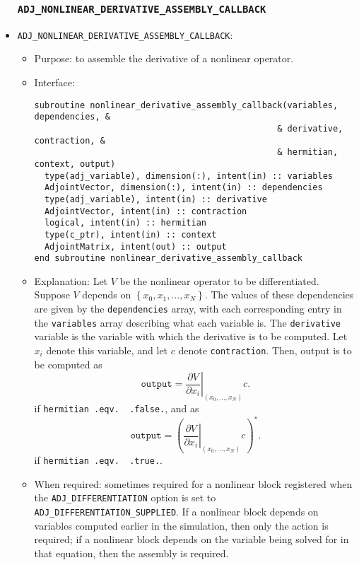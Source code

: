 \documentclass[10pt,authoryear]{elsarticle}
\begin{document}
\begin{itemize}
\subsubsection{\texttt{ADJ\_NONLINEAR\_DERIVATIVE\_ASSEMBLY\_CALLBACK}}
\item \texttt{ADJ\_NONLINEAR\_DERIVATIVE\_ASSEMBLY\_CALLBACK}:
 \begin{itemize} 
 \item Purpose: to assemble the derivative of a nonlinear operator.
 \item Interface:
\begin{verbatim}
subroutine nonlinear_derivative_assembly_callback(variables, dependencies, &
                                                & derivative, contraction, & 
                                                & hermitian, context, output)
  type(adj_variable), dimension(:), intent(in) :: variables
  AdjointVector, dimension(:), intent(in) :: dependencies
  type(adj_variable), intent(in) :: derivative
  AdjointVector, intent(in) :: contraction
  logical, intent(in) :: hermitian
  type(c_ptr), intent(in) :: context
  AdjointMatrix, intent(out) :: output
end subroutine nonlinear_derivative_assembly_callback
\end{verbatim}
 \item Explanation: Let $V$ be the nonlinear operator to be differentiated. Suppose $V$ depends on $\left\{x_0, x_1, \dots, x_N\right\}$. The values of these
dependencies are given by the \texttt{dependencies} array, with each corresponding entry in the \texttt{variables} array describing what each variable is. The \texttt{derivative} variable
is the variable with which the derivative is to be computed. Let $x_i$ denote this variable, and let $c$ denote \texttt{contraction}. Then, output is to be computed as
\begin{equation}
\texttt{output} = \left.\frac{\partial V}{\partial x_i}\right|_{(x_0, \dots, x_N)}c.
\end{equation}
if \texttt{hermitian .eqv. $\!\!\!\!\!\!\!$ .false.}, and as
\begin{equation}
\texttt{output} = \left(\left.\frac{\partial V}{\partial x_i}\right|_{(x_0, \dots, x_N)}c\right)^*.
\end{equation}
if \texttt{hermitian .eqv. $\!\!\!\!\!\!\!$ .true.}.
 \item When required: sometimes required for a nonlinear block registered when the \newline\texttt{ADJ\_DIFFERENTIATION} option is set to \texttt{ADJ\_DIFFERENTIATION\_SUPPLIED}.
If a nonlinear block depends on variables computed earlier in the simulation, then only the action is required; if a nonlinear block depends on the variable being solved for in that equation,
then the assembly is required.
 \end{itemize}


\end{itemize}
\end{document}
